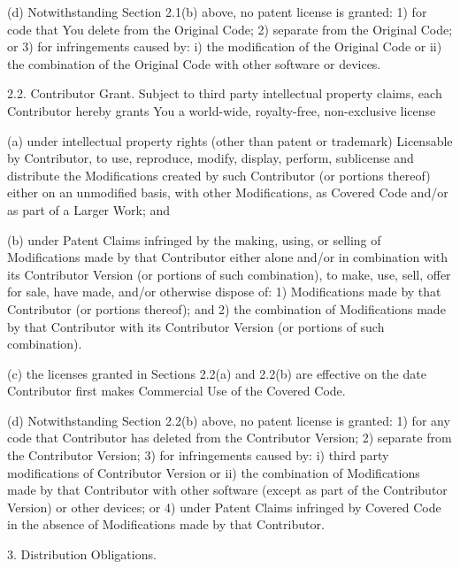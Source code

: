 \begin{DoxyCode}
          (d) Notwithstanding Section 2.1(b) above, no patent license is
          granted: 1) for code that You delete from the Original Code; 2)
          separate from the Original Code;  or 3) for infringements caused
          by: i) the modification of the Original Code or ii) the
          combination of the Original Code with other software or devices.

     2.2. Contributor Grant.
     Subject to third party intellectual property claims, each Contributor
     hereby grants You a world-wide, royalty-free, non-exclusive license

          (a)  under intellectual property rights (other than patent or
          trademark) Licensable by Contributor, to use, reproduce, modify,
          display, perform, sublicense and distribute the Modifications
          created by such Contributor (or portions thereof) either on an
          unmodified basis, with other Modifications, as Covered Code
          and/or as part of a Larger Work; and

          (b) under Patent Claims infringed by the making, using, or
          selling of  Modifications made by that Contributor either alone
          and/or in combination with its Contributor Version (or portions
          of such combination), to make, use, sell, offer for sale, have
          made, and/or otherwise dispose of: 1) Modifications made by that
          Contributor (or portions thereof); and 2) the combination of
          Modifications made by that Contributor with its Contributor
          Version (or portions of such combination).

          (c) the licenses granted in Sections 2.2(a) and 2.2(b) are
          effective on the date Contributor first makes Commercial Use of
          the Covered Code.

          (d)    Notwithstanding Section 2.2(b) above, no patent license is
          granted: 1) for any code that Contributor has deleted from the
          Contributor Version; 2)  separate from the Contributor Version;
          3)  for infringements caused by: i) third party modifications of
          Contributor Version or ii)  the combination of Modifications made
          by that Contributor with other software  (except as part of the
          Contributor Version) or other devices; or 4) under Patent Claims
          infringed by Covered Code in the absence of Modifications made by
          that Contributor.

3. Distribution Obligations.


\end{DoxyCode}
